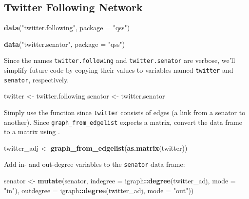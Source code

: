 \documentclass[]{book}
\newenvironment{Shaded}{\begin{snugshade}}{\end{snugshade}}
\newcommand{\DataTypeTok}[1]{\textcolor[rgb]{0.13,0.29,0.53}{#1}}
\newcommand{\KeywordTok}[1]{\textcolor[rgb]{0.13,0.29,0.53}{\textbf{#1}}}
\newcommand{\NormalTok}[1]{#1}
\newcommand{\OperatorTok}[1]{\textcolor[rgb]{0.81,0.36,0.00}{\textbf{#1}}}
\newcommand{\StringTok}[1]{\textcolor[rgb]{0.31,0.60,0.02}{#1}}
\theoremstyle{definition}
\theoremstyle{definition}
\theoremstyle{definition}
\theoremstyle{remark}
\begin{document}
\hypertarget{twitter-following-network}{%
\subsection{Twitter Following Network}\label{twitter-following-network}}

\begin{Shaded}
\begin{Highlighting}[]
\KeywordTok{data}\NormalTok{(}\StringTok{"twitter.following"}\NormalTok{, }\DataTypeTok{package =} \StringTok{"qss"}\NormalTok{)}
\end{Highlighting}
\end{Shaded}

\begin{Shaded}
\begin{Highlighting}[]
\KeywordTok{data}\NormalTok{(}\StringTok{"twitter.senator"}\NormalTok{, }\DataTypeTok{package =} \StringTok{"qss"}\NormalTok{)}
\end{Highlighting}
\end{Shaded}

Since the names \texttt{twitter.following} and \texttt{twitter.senator}
are verbose, we'll simplify future code by copying their values to
variables named \texttt{twitter} and \texttt{senator}, respectively.

\begin{Shaded}
\begin{Highlighting}[]
\NormalTok{twitter <-}\StringTok{ }\NormalTok{twitter.following}
\NormalTok{senator <-}\StringTok{ }\NormalTok{twitter.senator}
\end{Highlighting}
\end{Shaded}

Simply use the function since \texttt{twitter} consists of edges (a link
from a senator to another). Since \texttt{graph\_from\_edgelist} expects
a matrix, convert the data frame to a matrix using .

\begin{Shaded}
\begin{Highlighting}[]
\NormalTok{twitter_adj <-}\StringTok{ }\KeywordTok{graph_from_edgelist}\NormalTok{(}\KeywordTok{as.matrix}\NormalTok{(twitter))}
\end{Highlighting}
\end{Shaded}

Add in- and out-degree variables to the \texttt{senator} data frame:

\begin{Shaded}
\begin{Highlighting}[]
\NormalTok{senator <-}
\StringTok{  }\KeywordTok{mutate}\NormalTok{(senator,}
         \DataTypeTok{indegree =}\NormalTok{ igraph}\OperatorTok{::}\KeywordTok{degree}\NormalTok{(twitter_adj, }\DataTypeTok{mode =} \StringTok{"in"}\NormalTok{),}
         \DataTypeTok{outdegree =}\NormalTok{ igraph}\OperatorTok{::}\KeywordTok{degree}\NormalTok{(twitter_adj, }\DataTypeTok{mode =} \StringTok{"out"}\NormalTok{))}
\end{Highlighting}
\end{Shaded}
\end{document}
